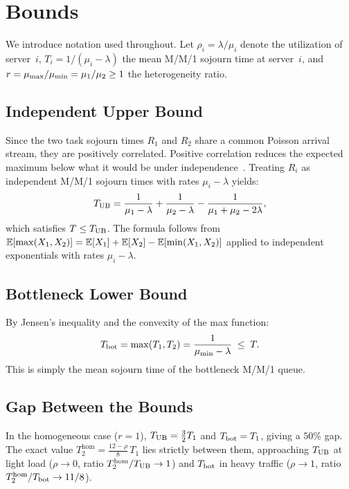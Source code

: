 \section{Bounds}
\label{sec:bounds}

We introduce notation used throughout.
Let $\rho_i = \lambda/\mu_i$ denote the utilization of server~$i$,
$T_i = 1/(\mu_i - \lambda)$ the mean M/M/1 sojourn time at server~$i$,
and $r = \mu_{\max}/\mu_{\min} = \mu_1/\mu_2 \geq 1$ the heterogeneity ratio.

\subsection{Independent Upper Bound}

Since the two task sojourn times $R_1$ and $R_2$ share a common Poisson
arrival stream, they are positively correlated.
Positive correlation reduces the expected maximum below what it would be
under independence~\citep{Baccelli1989}.
Treating $R_i$ as independent M/M/1 sojourn times with rates $\mu_i - \lambda$
yields:
\begin{equation}
  \label{eq:tub}
  T_{\text{UB}} = \frac{1}{\mu_1 - \lambda} + \frac{1}{\mu_2 - \lambda}
         - \frac{1}{\mu_1 + \mu_2 - 2\lambda},
\end{equation}
which satisfies $T \leq T_{\text{UB}}$.
The formula follows from $\mathbb{E}[\max(X_1,X_2)] = \mathbb{E}[X_1] + \mathbb{E}[X_2] - \mathbb{E}[\min(X_1,X_2)]$
applied to independent exponentials with rates $\mu_i - \lambda$.

\subsection{Bottleneck Lower Bound}

By Jensen's inequality and the convexity of the max function:
\begin{equation}
  \label{eq:tbot}
  T_{\text{bot}} = \max(T_1, T_2) = \frac{1}{\mu_{\min} - \lambda} \;\leq\; T.
\end{equation}
This is simply the mean sojourn time of the bottleneck M/M/1 queue.

\subsection{Gap Between the Bounds}

In the homogeneous case ($r = 1$), $T_{\text{UB}} = \tfrac{3}{2}T_1$ and
$T_{\text{bot}} = T_1$, giving a $50\%$ gap.
The exact value $T_2^{\mathrm{hom}} = \tfrac{12-\rho}{8}\,T_1$ lies strictly
between them, approaching $T_{\text{UB}}$ at light load ($\rho \to 0$, ratio $T_2^{\mathrm{hom}}/T_{\text{UB}} \to 1$)
and $T_{\text{bot}}$ in heavy traffic ($\rho \to 1$, ratio $T_2^{\mathrm{hom}}/T_{\text{bot}} \to 11/8$).

